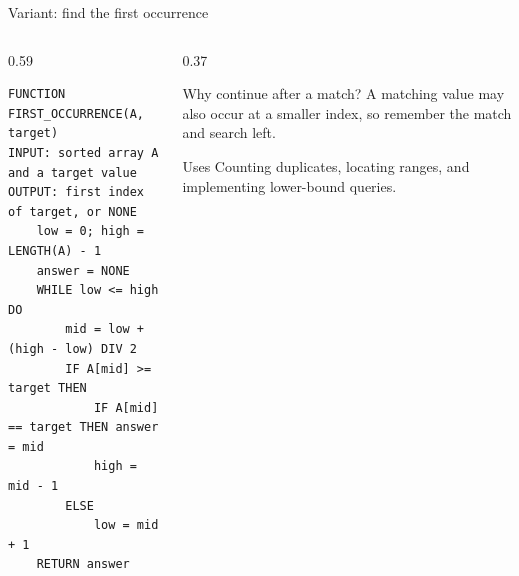 \documentclass[aspectratio=169]{beamer}
\begin{document}
\begin{frame}[fragile]{Variant: find the first occurrence}
  \begin{columns}[T]
    \begin{column}{0.59\textwidth}
\begin{lstlisting}[style=pseudonumbered]
FUNCTION FIRST_OCCURRENCE(A, target)
INPUT: sorted array A and a target value
OUTPUT: first index of target, or NONE
    low = 0; high = LENGTH(A) - 1
    answer = NONE
    WHILE low <= high DO
        mid = low + (high - low) DIV 2
        IF A[mid] >= target THEN
            IF A[mid] == target THEN answer = mid
            high = mid - 1
        ELSE
            low = mid + 1
    RETURN answer
\end{lstlisting}
    \end{column}
    \begin{column}{0.37\textwidth}
      \begin{block}{Why continue after a match?}
        A matching value may also occur at a smaller index, so remember the
        match and search left.
      \end{block}
      \begin{exampleblock}{Uses}
        Counting duplicates, locating ranges, and implementing lower-bound
        queries.
      \end{exampleblock}
    \end{column}
  \end{columns}
\end{frame}
\end{document}
